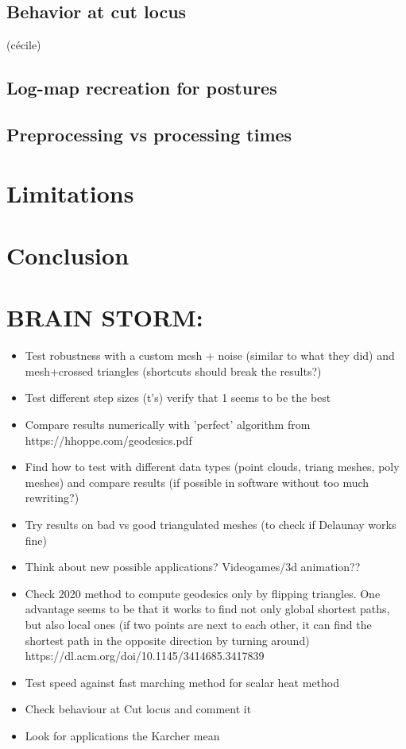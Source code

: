 \documentclass[sigconf]{acmart}
\begin{document}
\subsection{Behavior at cut locus}
(cécile)
\subsection{Log-map recreation for postures}

\subsection{Preprocessing vs processing times}

\section{Limitations}
\section{Conclusion}




\section{BRAIN STORM:}
\begin{itemize}
  \item Test robustness with a custom mesh + noise (similar to what they did) and mesh+crossed triangles (shortcuts should break the results?)
  \item Test different step sizes (t's) verify that 1 seems to be the best
  \item Compare results numerically with 'perfect' algorithm from https://hhoppe.com/geodesics.pdf
  \item Find how to test with different data types (point clouds, triang meshes, poly meshes) and compare results (if possible in software without too much rewriting?)
  \item Try results on bad vs good triangulated meshes (to check if Delaunay works fine)
  \item Think about new possible applications? Videogames/3d animation?? 
  \item Check 2020 method to compute geodesics only by flipping triangles. One advantage seems to be that it works to find not only global shortest paths, but also local ones (if two points are next to each other, it can find the shortest path in the opposite direction by turning around)  https://dl.acm.org/doi/10.1145/3414685.3417839
  \item Test speed against fast marching method for scalar heat method
  \item Check behaviour at Cut locus and comment it
  \item Look for applications the Karcher mean
\end{itemize}



\end{document}
